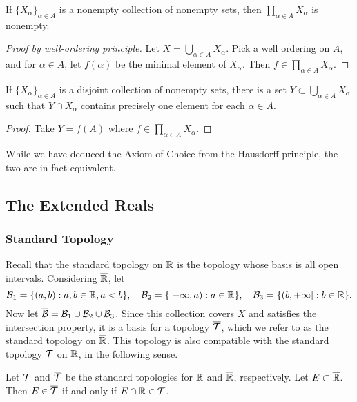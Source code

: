 \documentclass[12pt]{article} %
\begin{document}
\begin{principle}
    If $\{X_\alpha\}_{\alpha \in A}$ is a nonempty collection of nonempty sets, then $\prod_{\alpha \in A} X_\alpha$ is nonempty.
\end{principle}

\begin{proof}[Proof by well-ordering principle]
    Let $X = \bigcup_{\alpha \in A} X_\alpha$. Pick a well ordering on $A$, and for $\alpha \in A$, let $f(\alpha)$ be the minimal element of $X_\alpha$. Then $f \in \prod_{\alpha \in A} X_\alpha$.
\end{proof}

\begin{corollary}
    If $\{X_\alpha\}_{\alpha \in A}$ is a disjoint collection of nonempty sets, there is a set $Y \subset \bigcup_{\alpha \in A} X_\alpha$ such that $Y \cap X_\alpha$ contains precisely one element for each $\alpha \in A$.
\end{corollary}

\begin{proof}
    Take $Y = f(A)$ where $f \in \prod_{\alpha \in A} X_\alpha$.
\end{proof}

\noindent While we have deduced the Axiom of Choice from the Hausdorff principle, the two are in fact equivalent.

\subsection{The Extended Reals}

\subsubsection{Standard Topology}

Recall that the standard topology on $\mathbb{R}$ is the topology whose basis is all open intervals. Considering $\overline{\mathbb{R}}$, let \[\mathcal{B}_1 = \{(a, b) :  a, b \in \mathbb{R}, a < b\}, \ \ \ \mathcal{B}_2 = \{[-\infty, a) : a \in \mathbb{R}\}, \ \ \ \mathcal{B}_3 = \{(b, + \infty] : b \in \mathbb{R}\}.\] Now let $\overline{\mathcal{B}} = \mathcal{B}_1 \cup \mathcal{B}_2 \cup \mathcal{B}_3$. Since this collection covers $X$ and satisfies the intersection property, it is a basis for a topology $\overline{\mathcal{T}}$, which we refer to as the standard topology on $\overline{\mathbb{R}}$. This topology is also compatible with the standard topology $\mathcal{T}$ on $\mathbb{R}$, in the following sense.

\begin{proposition}
    Let $\mathcal{T}$ and $\overline{\mathcal{T}}$ be the standard topologies for $\mathbb{R}$ and $\overline{\mathbb{R}}$, respectively. Let $E \subset \overline{\mathbb{R}}$. Then $E \in \overline{\mathcal{T}}$ if and only if $E \cap \mathbb{R} \in \mathcal{T}$.
\end{proposition}
\end{document}
